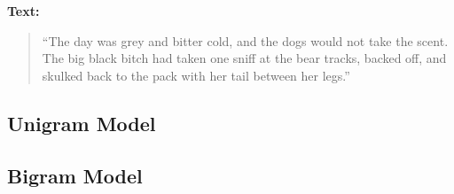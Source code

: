 \textbf {Text:}
\begin{quote}
“The day was grey and bitter cold, and the dogs would not take the scent. The big black bitch had taken one sniff at the bear tracks, backed oﬀ, and skulked back to the pack with her tail between her legs.”
\end{quote}
\subsection{Unigram Model}
\subsection{Bigram Model}
